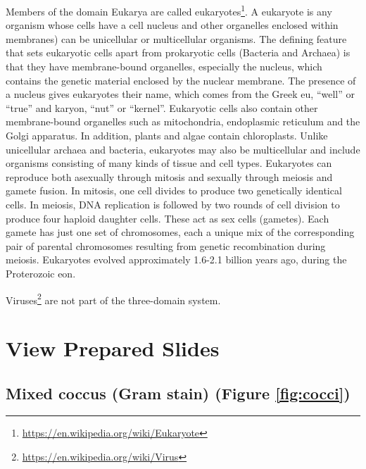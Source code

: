 \documentclass[]{book}
\let\rmarkdownfootnote\footnote%
\def\footnote{\protect\rmarkdownfootnote}
\renewcommand{\href}[2]{#2\footnote{\url{#1}}}
\begin{document}
Members of the domain Eukarya are called \href{https://en.wikipedia.org/wiki/Eukaryote}{eukaryotes}. A eukaryote is any organism whose cells have a cell nucleus and other organelles enclosed within membranes) can be unicellular or multicellular organisms. The defining feature that sets eukaryotic cells apart from prokaryotic cells (Bacteria and Archaea) is that they have membrane-bound organelles, especially the nucleus, which contains the genetic material enclosed by the nuclear membrane. The presence of a nucleus gives eukaryotes their name, which comes from the Greek eu, ``well'' or ``true'' and karyon, ``nut'' or ``kernel''. Eukaryotic cells also contain other membrane-bound organelles such as mitochondria, endoplasmic reticulum and the Golgi apparatus. In addition, plants and algae contain chloroplasts. Unlike unicellular archaea and bacteria, eukaryotes may also be multicellular and include organisms consisting of many kinds of tissue and cell types.
Eukaryotes can reproduce both asexually through mitosis and sexually through meiosis and gamete fusion. In mitosis, one cell divides to produce two genetically identical cells. In meiosis, DNA replication is followed by two rounds of cell division to produce four haploid daughter cells. These act as sex cells (gametes). Each gamete has just one set of chromosomes, each a unique mix of the corresponding pair of parental chromosomes resulting from genetic recombination during meiosis.
Eukaryotes evolved approximately 1.6-2.1 billion years ago, during the Proterozoic eon.

\href{https://en.wikipedia.org/wiki/Virus}{Viruses} are not part of the three-domain system.

\hypertarget{view-prepared-slides-2}{%
\section{View Prepared Slides}\label{view-prepared-slides-2}}

\hypertarget{mixed-coccus-gram-stain-figure-reffigcocci}{%
\subsection{Mixed coccus (Gram stain) (Figure \ref{fig:cocci})}\label{mixed-coccus-gram-stain-figure-reffigcocci}}
\end{document}
